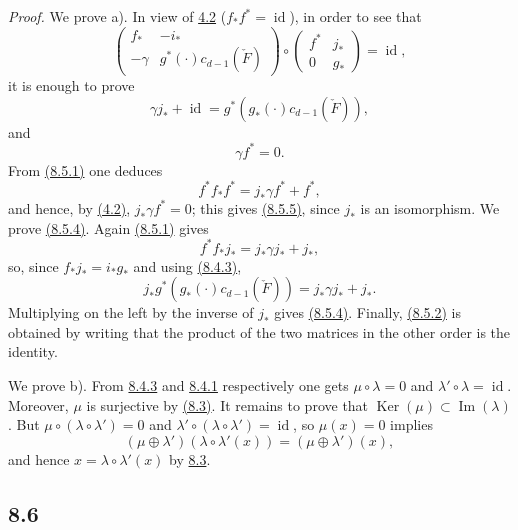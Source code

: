 \documentclass[11pt]{article}
\providecommand{\Ker}{\operatorname{Ker}}
\providecommand{\Ker}{\operatorname{Ker}}
\providecommand{\Ker}{\operatorname{Ker}}
\begin{document}
\emph{Proof.} We prove a). In view of \hyperref[sga5:VII:lemma:4.2]{4.2} ($f_*f^*=\operatorname{id}$), in order to see that
\[
\begin{pmatrix}
f_*&-i_*\\
-\gamma&g^*(\cdot)c_{d-1}(\check F)
\end{pmatrix}
\circ
\begin{pmatrix}
f^*&j_*\\
0&g_*
\end{pmatrix}
=\operatorname{id},
\]
it is enough to prove
\[
\gamma j_*+\operatorname{id}=g^*(g_*(\cdot)c_{d-1}(\check F)),
\tag{8.5.4}\label{sga5:VII:equation:8.5.4}
\]
and
\[
\gamma f^*=0.
\tag{8.5.5}\label{sga5:VII:equation:8.5.5}
\]
From \hyperref[sga5:VII:equation:8.5.1]{(8.5.1)} one deduces
\[
f^*f_*f^*=j_*\gamma f^*+f^*,
\]
and hence, by \hyperref[sga5:VII:lemma:4.2]{(4.2)}, $j_*\gamma f^*=0$; this gives \hyperref[sga5:VII:equation:8.5.5]{(8.5.5)}, since $j_*$ is an isomorphism. We prove \hyperref[sga5:VII:equation:8.5.4]{(8.5.4)}. Again \hyperref[sga5:VII:equation:8.5.1]{(8.5.1)} gives
\[
f^*f_*j_*=j_*\gamma j_*+j_*,
\]
so, since $f_*j_*=i_*g_*$ and using \hyperref[sga5:VII:lemma:8.4.3]{(8.4.3)},
\[
j_*g^*(g_*(\cdot)c_{d-1}(\check F))=j_*\gamma j_*+j_*.
\]
Multiplying on the left by the inverse of $j_*$ gives \hyperref[sga5:VII:equation:8.5.4]{(8.5.4)}. Finally, \hyperref[sga5:VII:equation:8.5.2]{(8.5.2)} is obtained by writing that the product of the two matrices in the other order is the identity.

We prove b). From \hyperref[sga5:VII:lemma:8.4.3]{8.4.3} and \hyperref[sga5:VII:lemma:8.4.1]{8.4.1} respectively one gets $\mu\circ\lambda=0$ and $\lambda'\circ\lambda=\operatorname{id}$. Moreover, $\mu$ is surjective by \hyperref[sga5:VII:corollary:8.3]{(8.3)}. It remains to prove that $\Ker(\mu)\subset\operatorname{Im}(\lambda)$. But $\mu\circ(\lambda\circ\lambda')=0$ and $\lambda'\circ(\lambda\circ\lambda')=\operatorname{id}$, so $\mu(x)=0$ implies
\[
(\mu\oplus\lambda')(\lambda\circ\lambda'(x))=(\mu\oplus\lambda')(x),
\]
and hence $x=\lambda\circ\lambda'(x)$ by \hyperref[sga5:VII:corollary:8.3]{8.3}.

\subsection*{8.6}\label{sga5:VII:subsection:8.6}
\end{document}
